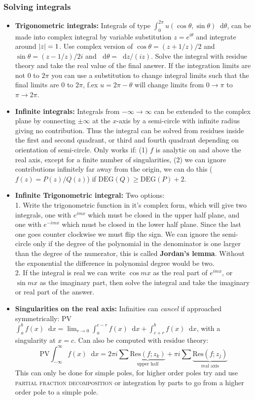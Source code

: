 \documentclass[a4paper, 10pt]{article}
\newcommand*\diff{\mathop{}\!\mathrm{d}}
\begin{document}
\begin{multicols*}{3}
\subsubsection*{Solving integrals}
\begin{itemize}
\item \textbf{Trigonometric integrals:} Integrals of type $\int_0^{2\pi} u(\cos{\theta}, \sin{\theta}) \diff \theta$, can be made into complex integral by variable substitution $z=e^{i\theta}$ and integrate around $\abs{z}=1$. Use complex version of $\cos{\theta} = (z+1/z)/2$ and $\sin{\theta}=(z-1/z)/2i$ and $\diff \theta = \diff z/(iz)$. Solve the integral with residue theory and take the real value of the final answer.
If the integration limits are not $0$ to $2\pi$ you can use a substitution to change integral limits such that the final limits are $0$ to $2\pi$, f.ex $u=2\pi-\theta$ will change limits from $0\rightarrow\pi$ to $\pi\rightarrow 2\pi$.
\item \textbf{Infinite integrals:} Integrals from $-\infty\rightarrow\infty$ can be extended to the complex plane by connecting $\pm\infty$ at the $x$-axis by a semi-circle with infinite radius giving no contribution. Thus the integral can be solved from residues inside the first and second quadrant, or third and fourth quadrant depending on orientation of semi-circle. Only works if: (1) $f$ is analytic on and above the real axis, except for a finite number of singularities, (2) we can ignore contributions infinitely far away from the origin, we can do this ($f(z)=P(z)/Q(z)$) if $\text{DEG}(Q) \geq \text{DEG}(P)+2$.
\item \textbf{Infinite Trigonometric integral:} Two options:\\1. Write the trigonometric function in it's complex form, which will give two integrals, one with $e^{imx}$ which must be closed in the upper half plane, and one with $e^{-imx}$ which must be closed in the lower half plane. Since the last one goes counter clockwise we must flip the sign. We can ignore the semi-circle only if the degree of the polynomial in the denominator is one larger than the degree of the numerator, this is called \textbf{Jordan's lemma}. Without the exponential the difference in polynomial degree would be two. \\2. If the integral is real we can write $\cos{mx}$ as the real part of $e^{imx}$, or $\sin{mx}$ as the imaginary part, then solve the integral and take the imaginary or real part of the answer.
\item \textbf{Singularities on the real axis:} Infinities can \textit{cancel} if approached symmetrically: PV$\int_a^b f(x)\diff x = \lim_{r\rightarrow 0} \int_a^{c-r} f(x)\diff x + \int_{c+r}^{b}f(x)\diff x$, with a singularity at $x=c$. Can also be computed with residue theory:
$$\text{PV}\int_{-\infty}^{\infty} f(x)\diff x = 2\pi i \sum \underbrace{\text{Res}(f; z_k)}_{\text{upper half}} + \pi i \sum \underbrace{\text{Res}(f;z_j)}_{\text{real axis}}$$This can only be done for simple poles, for higher order poles try and use \textsc{partial fraction decomposition} or integration by parts to go from a higher order pole to a simple pole.
\end{itemize}
\newpage
\begin{mdframed}

\end{mdframed}
\end{multicols*}
\end{document}
